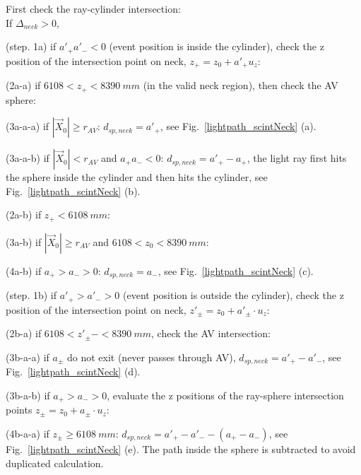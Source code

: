\begin{algorithm}
	
	First check the ray-cylinder intersection:\\
	If {$\Delta_{neck}>0$}, 
	
	\hspace{2mm}(step. 1a) if $a'_+a'_-<0$ (event position is inside the cylinder), check the z position of the intersection point on neck, $z_+ = z_0 + a'_+u_z$: 
	
	\hspace{6mm}(2a-a) if $6108<z_+<8390~mm$ (in the valid neck region), then check the AV sphere:
	
	\hspace{8mm}(3a-a-a) if $|\vec{X}_0|\geq r_{AV}$: $d_{sp,neck}=a'_+$, see Fig.~\ref{lightpath_scintNeck} (a).
	
	\hspace{8mm}(3a-a-b) if $|\vec{X}_0|<r_{AV}$ and $a_+a_-<0$: $d_{sp,neck}=a'_+-a_+$, the light ray first hits the sphere inside the cylinder and then hits the cylinder, see Fig.~\ref{lightpath_scintNeck} (b). 
	
	\hspace{6mm}(2a-b) if $z_+<6108~mm$:
	
	\hspace{8mm}(3a-b) if $|\vec X_0|\geq r_{AV}$ and $6108<z_0<8390~mm$:
	
	\hspace{10mm}(4a-b) if $a_+>a_->0$: $d_{sp,neck}=a_-$, see Fig.~\ref{lightpath_scintNeck} (c).
	
	\hspace{2mm}(step. 1b) if $a'_+>a'_->0$ (event position is outside the cylinder), check the z position of the intersection point on neck, $z'_{\pm}=z_0+a'_\pm\cdot u_z$:
	
	\hspace{6mm}(2b-a) if $6108<z'_\pm-<8390~mm$, check the AV intersection:
	
	\hspace{8mm}(3b-a-a) if $a_\pm$ do not exit (never passes through AV), $d_{sp,neck}=a'_+ - a'_-$, see Fig.~\ref{lightpath_scintNeck} (d).
	
	\hspace{8mm}(3b-a-b) if $a_+>a_->0$, evaluate the z positions of the ray-sphere intersection points $z_\pm=z_0+a_\pm\cdot u_z$:
	
	\hspace{10mm}(4b-a-a) if $z_\pm\geq 6108~mm$: $d_{sp,neck}=a'_+ - a'_--(a_+-a_-)$, see Fig.~\ref{lightpath_scintNeck} (e). The path inside the sphere is subtracted to avoid duplicated calculation.
	

\end{algorithm}
